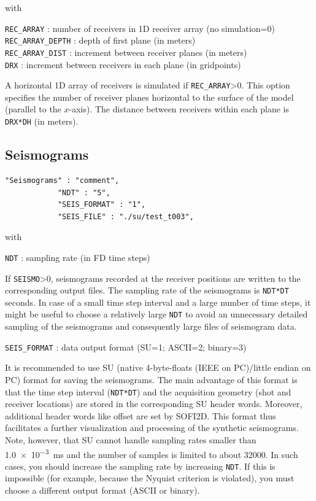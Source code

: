 with

\texttt{REC\_ARRAY} : number of receivers in 1D receiver array (no simulation=0)\\
\texttt{REC\_ARRAY\_DEPTH} : depth of first plane (in meters)\\
\texttt{REC\_ARRAY\_DIST} : increment between receiver planes (in meters)\\
\texttt{DRX} : increment between receivers in each plane (in gridpoints)

A horizontal 1D array of receivers is simulated if \texttt{REC\_ARRAY}>0. This option specifies the number of receiver planes horizontal to the surface of the model (parallel to the $x$-axis). The distance between receivers within each plane is \texttt{DRX*DH} (in meters).

\subsection{Seismograms}
\label{seismograms}
\begin{verbatim}
"Seismograms" : "comment",
            "NDT" : "5",
            "SEIS_FORMAT" : "1",
            "SEIS_FILE" : "./su/test_t003",
\end{verbatim}

with

\texttt{NDT} : sampling rate (in FD time steps)

If \texttt{SEISMO}>0, seismograms recorded at the receiver positions are written to the corresponding output files. The sampling rate of the seismograms is \texttt{NDT*DT} seconds. In case of a small time step interval and a large number of time steps, it might be useful to choose a relatively large \texttt{NDT} to avoid an unnecessary detailed sampling of the seismograms and consequently large files of seismogram data.

\texttt{SEIS\_FORMAT} : data output format (SU=1; ASCII=2; binary=3)

It is recommended to use SU (native 4-byte-floats (IEEE on PC)/little endian on PC) format for saving the seismograms. The main advantage of this format is that the time step interval (\texttt{NDT*DT}) and the acquisition geometry (shot and receiver locations) are stored in the corresponding SU header words. Moreover, additional header words like offset are set by SOFI2D. This format thus facilitates a further visualization and processing of the synthetic seismograms. Note, however, that SU cannot handle sampling rates smaller than \SI{1.0e-3}{ms} and the number of samples is limited to about \SI{32000}{}. In such cases, you should increase the sampling rate by increasing \texttt{NDT}. If this is impossible (for example, because the Nyquist criterion is violated), you must choose a different output format (ASCII or binary). 

